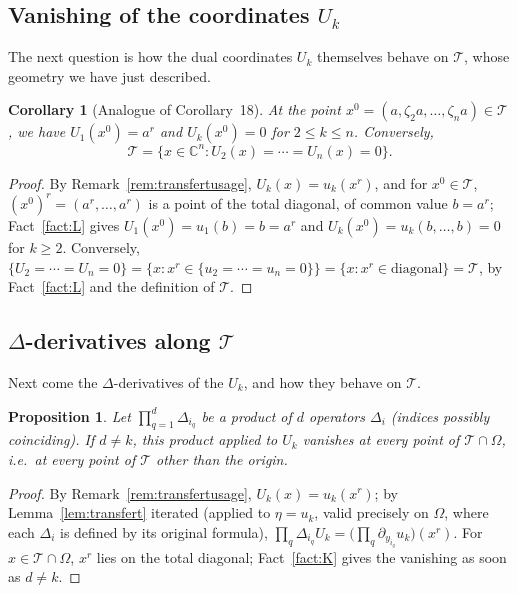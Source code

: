 \documentclass[10pt,a4paper]{amsart}
\newtheorem{proposition}[theorem]{Proposition}
\newtheorem{corollary}[theorem]{Corollary}
\newcommand{\CC}{\mathbb{C}}
\begin{document}
\subsection{Vanishing of the coordinates $U_k$}

The next question is how the dual coordinates $U_k$ themselves behave on $\mathcal T$, whose geometry we have just described.

\begin{corollary}[Analogue of Corollary~18]\label{cor:diag}
At the point $x^0=(a,\zeta_2a,\dots,\zeta_na)\in\mathcal T$, we have $U_1(x^0)=a^r$ and $U_k(x^0)=0$ for $2\le k\le n$. Conversely,
\[
\mathcal T = \{x\in\CC^n : U_2(x)=\cdots=U_n(x)=0\}.
\]
\end{corollary}

\begin{proof}
By Remark~\ref{rem:transfertusage}, $U_k(x)=u_k(x^r)$, and for $x^0\in\mathcal T$, $(x^0)^r=(a^r,\dots,a^r)$ is a point of the total diagonal, of common value $b=a^r$; Fact~\ref{fact:L} gives $U_1(x^0)=u_1(b)=b=a^r$ and $U_k(x^0)=u_k(b,\dots,b)=0$ for $k\ge2$. Conversely, $\{U_2=\cdots=U_n=0\}=\{x : x^r\in\{u_2=\cdots=u_n=0\}\}=\{x:x^r\in\text{diagonal}\}=\mathcal T$, by Fact~\ref{fact:L} and the definition of $\mathcal T$.
\end{proof}

\subsection{$\Delta$-derivatives along $\mathcal T$}

Next come the $\Delta$-derivatives of the $U_k$, and how they behave on $\mathcal T$.

\begin{proposition}\label{prop:thm16delta}
Let $\prod_{q=1}^d \Delta_{i_q}$ be a product of $d$ operators $\Delta_i$ (indices possibly coinciding). If $d\ne k$, this product applied to $U_k$ vanishes at every point of $\mathcal T\cap\Omega$, i.e.\ at every point of $\mathcal T$ other than the origin.
\end{proposition}

\begin{proof}
By Remark~\ref{rem:transfertusage}, $U_k(x)=u_k(x^r)$; by Lemma~\ref{lem:transfert} iterated (applied to $\eta=u_k$, valid precisely on $\Omega$, where each $\Delta_i$ is defined by its original formula), $\prod_q\Delta_{i_q}U_k = \big(\prod_q \partial_{y_{i_q}}u_k\big)(x^r)$. For $x\in\mathcal T\cap\Omega$, $x^r$ lies on the total diagonal; Fact~\ref{fact:K} gives the vanishing as soon as $d\ne k$.
\end{proof}
\end{document}
